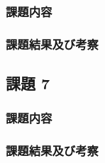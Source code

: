 \subsubsection{課題内容}

\subsubsection{課題結果及び考察}


\subsection{課題 7}


\subsubsection{課題内容}

\subsubsection{課題結果及び考察}

